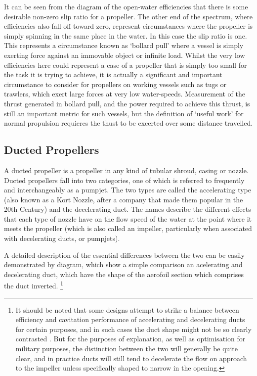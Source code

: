 \documentclass{article}\usepackage[]{graphicx}\usepackage[]{color}
\begin{document}
It can be seen from the diagram of the open-water efficiencies that there is some desirable non-zero slip ratio for a propeller.  The other end of the spectrum, where efficiencies also fall off toward zero, represent circumstances where the propeller is simply spinning in the same place in the water. In this case the slip ratio is one.  This represents a circumstance known as `bollard pull' where a vessel is simply exerting force against an immovable object or infinite load.  Whilst the very low efficiencies here could represent a case of a propeller that is simply too small for the task it is trying to achieve, it is actually a significant and important circumstance to consider for propellers on working vessels such as tugs or trawlers, which exert large forces at very low water-speeds.  Measurement of the thrust generated in bollard pull, and the power required to achieve this thrust, is still an important metric for such vessels, but the definition of `useful work' for normal propulsion requieres the thust to be excerted over some distance travelled.

\subsection{Ducted Propellers}
A ducted propeller is a propeller in any kind of tubular shroud, casing or nozzle.  Ducted propellers fall into two categories, one of which is referred to frequently and interchangeably as a pumpjet.  The two types are called the accelerating type (also known as a Kort Nozzle, after a company that made them popular in the 20th Century) and the decelerating duct.  The names describe the different effects that each type of nozzle have on the flow speed of the water at the point where it meets the propeller (which is also called an impeller, particularly when associated with decelerating ducts, or pumpjets).

A detailed description of the essential differences between the two can be easily demonstrated by diagram, which show a simple comparison an acelerating and decelerating duct, which have the shape of the aerofoil section which comprises the duct inverted. \footnote{It should be noted that some designs attempt to strike a balance between efficiency and cavitation performance of accelerating and decelerating ducts for certain purposes, and in such cases the duct shape might not be so clearly contrasted \parencite{abdel2010}.  But for the purposes of explanation, as well as optimisation for military purposes, the distinction between the two will generally be quite clear, and in practice ducts will still tend to decelerate the flow on approach to the impeller unless specifically shaped to narrow in the opening.}
\end{document}
